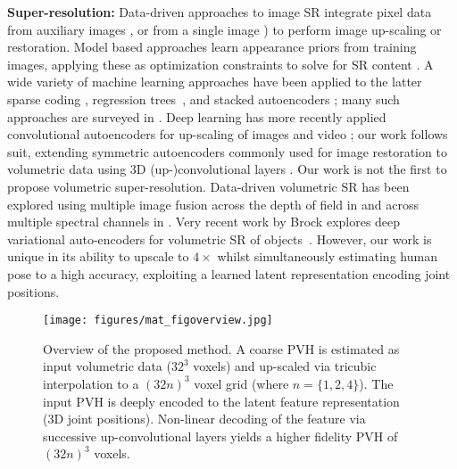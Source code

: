\documentclass[runningheads]{llncs}
\begin{document}
{\bf Super-resolution:} Data-driven approaches to image SR integrate pixel data \eg from auxiliary images \cite{Fattal2007}, or from a single image \cite{Glasner2009,Zhu2014}) to perform image up-scaling or restoration.  Model based approaches learn appearance priors from training images, applying these as optimization constraints to solve for SR content \cite{Freeman2002}. A wide variety of machine learning approaches have been applied to the latter \eg sparse coding \cite{Atalay2017}, regression trees~\cite{Schmidt2016}, and stacked autoencoders \cite{Vincent2008}; many such approaches are surveyed in \cite{srsurvey}.  Deep learning has more recently applied convolutional autoencoders for up-scaling of images \cite{Xie2012,Wang2015,Dong2016} and video \cite{Shi2016}; our work follows suit, extending symmetric autoencoders commonly used for image restoration to volumetric data using 3D (up-)convolutional layers \cite{Jain2008}.  Our work is not the first to propose volumetric super-resolution. Data-driven volumetric SR has been explored using multiple image fusion across the depth of field in \cite{Abrahamsson2017} and across multiple spectral channels in \cite{Atalay2017}.  Very recent work by Brock \etal explores deep variational auto-encoders for volumetric SR of objects~\cite{brock_generative_2016}. However, our work is unique in its ability to upscale to $4\times$ whilst simultaneously estimating human pose to a high accuracy, exploiting a learned latent representation encoding joint positions.


\begin{figure}[t!]
\centering
\texttt{[image: figures/mat\_figoverview.jpg]}
\caption{Overview of the proposed method.  A coarse PVH is estimated as input volumetric data ($32^3$ voxels) and up-scaled via tricubic interpolation to a $(32n)^3$ voxel grid (where $n=\{1,2,4\}$). The input PVH is deeply encoded to the latent feature representation (3D joint positions). Non-linear decoding of the feature via successive up-convolutional layers yields a higher fidelity PVH of $(32n)^3$ voxels. }
\label{fig:overview}
\squeezeup
\end{figure}
\end{document}
